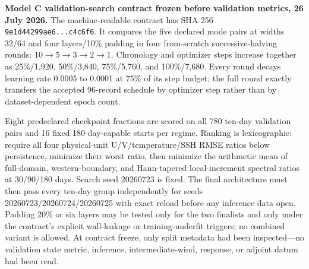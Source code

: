 \documentclass[11pt]{article}
\newenvironment{decisionbox}
  {\begin{center}\begin{lrbox}{\decisionstore}\begin{minipage}{0.92\textwidth}}
  {\end{minipage}\end{lrbox}\setlength{\fboxsep}{8pt}%
   \fcolorbox{teal}{lightteal}{\usebox{\decisionstore}}\end{center}}
\begin{document}
\begin{decisionbox}
\textbf{Model C validation-search contract frozen before validation metrics, 26 July
2026.}  The machine-readable contract
 has SHA-256
\texttt{9e1d44299ae6...c4c6f6}.  It compares the five declared mode pairs at widths
32/64 and four layers/10\% padding in four from-scratch successive-halving rounds:
\(10\rightarrow5\rightarrow3\rightarrow2\rightarrow1\).  Chronology and optimizer
steps increase together as 25\%/1,920, 50\%/3,840, 75\%/5,760, and
100\%/7,680.  Every round decays learning rate 0.0005 to 0.0001 at 75\% of its
step budget; the full round exactly transfers the accepted 96-record schedule by
optimizer step rather than by dataset-dependent epoch count.

Eight predeclared checkpoint fractions are scored on all 780 ten-day validation pairs
and 16 fixed 180-day-capable starts per regime.  Ranking is lexicographic: require all
four physical-unit U/V/temperature/SSH RMSE ratios below persistence, minimize their
worst ratio, then minimize the arithmetic mean of full-domain, western-boundary, and
Hann-tapered local-increment spectral ratios at 30/90/180 days.  Search seed 20260723
is fixed.  The final architecture must then pass every ten-day group independently for
seeds 20260723/20260724/20260725 with exact reload before any inference data open.
Padding 20\% or six layers may be tested only for the two finalists and only under the
contract's explicit wall-leakage or training-underfit triggers; no combined variant is
allowed.  At contract freeze, only split metadata had been inspected---no validation
state metric, inference, intermediate-wind, response, or adjoint datum had been read.
\end{decisionbox}
\end{document}
